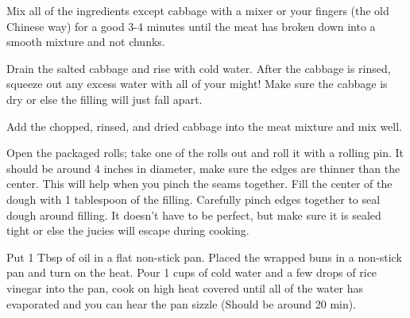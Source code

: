 
Mix all of the ingredients except cabbage with a mixer or your fingers (the old Chinese way) for a good 3-4 minutes until the meat has broken down into a smooth mixture and not chunks. 

Drain the salted cabbage and rise with cold water. After the cabbage is rinsed, squeeze out any excess water with all of your might! Make sure the cabbage is dry or else the filling will just fall apart. 

Add the chopped, rinsed, and dried cabbage into the meat mixture and mix well. 

Open the packaged rolls; take one of the rolls out and roll it with a rolling pin. It should be around 4 inches in diameter, make sure the edges are thinner than the center. This will help when you pinch the seams together. Fill the center of the dough with 1  tablespoon of the filling. Carefully pinch edges together to seal dough around filling. It doesn't have to be perfect, but make sure it is sealed tight or else the jucies will escape during cooking.

Put 1 Tbsp of oil in a flat non-stick pan. Placed the wrapped buns in a non-stick pan and turn on the heat. Pour 1  cups of cold water and a few drops of rice vinegar into the pan, cook on high heat covered until all of the water has evaporated and you can hear the pan sizzle (Should be around 20 min). 

